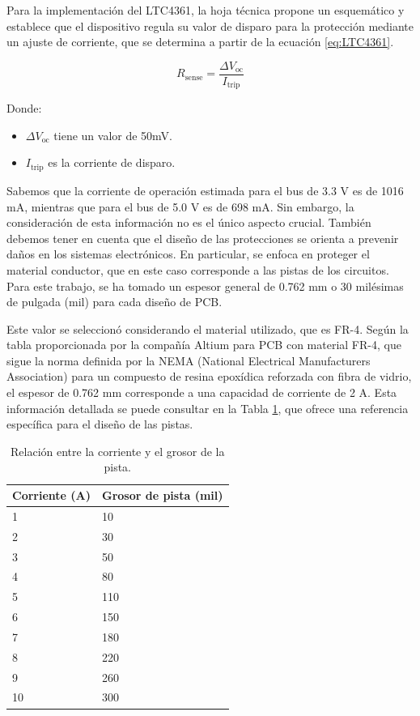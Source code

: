 Para la implementación del LTC4361, la hoja técnica propone un esquemático y establece que el dispositivo regula su valor de disparo para la protección mediante un ajuste de corriente, que se determina a partir de la ecuación \ref{eq:LTC4361}.

\begin{equation}\label{eq:LTC4361}
    R_{\text{sense}} = \frac{\Delta V_{\text{oc}}}{I_{\text{trip}}}
\end{equation}


Donde:
\begin{itemize}
    \item $\Delta V_{\text{oc}}$ tiene un valor de 50mV.
    \item $I_{\text{trip}}$ es la corriente de disparo.
\end{itemize}

Sabemos que la corriente de operación estimada para el bus de 3.3 V es de 1016 mA, mientras que para el bus de 5.0 V es de 698 mA. Sin embargo, la consideración de esta información no es el único aspecto crucial. También debemos tener en cuenta que el diseño de las protecciones se orienta a prevenir daños en los sistemas electrónicos. En particular, se enfoca en proteger el material conductor, que en este caso corresponde a las pistas de los circuitos. Para este trabajo, se ha tomado un espesor general de 0.762 mm o 30 milésimas de pulgada (mil) para cada diseño de PCB.

Este valor se seleccionó considerando el material utilizado, que es FR-4. Según la tabla proporcionada por la compañía Altium para PCB con material FR-4, que sigue la norma definida por la NEMA (National Electrical Manufacturers Association) para un compuesto de resina epoxídica reforzada con fibra de vidrio, el espesor de 0.762 mm corresponde a una capacidad de corriente de 2 A. Esta información detallada se puede consultar en la Tabla \ref{tab:relacion_corriente_grosor}, que ofrece una referencia específica para el diseño de las pistas.

\begin{table}[h]
    \centering
    \caption{Relación entre la corriente y el grosor de la pista.}
    \label{tab:relacion_corriente_grosor}
    \begin{tabular}{ll}
        \hline
        Corriente (A) & Grosor de pista (mil) \\ 
        \hline
        1 & 10 \\ 
        2 & 30 \\ 
        3 & 50 \\ 
        4 & 80 \\ 
        5 & 110 \\ 
        6 & 150 \\ 
        7 & 180 \\ 
        8 & 220 \\ 
        9 & 260 \\ 
        10 & 300 \\ 
        \hline
    \end{tabular}
\end{table}

